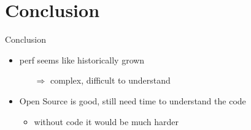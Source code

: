 \section{Conclusion}
\begin{frame}{Conclusion}
\begin{itemize}
  \item perf seems like historically grown
  \begin{itemize}
    \item[$\Rightarrow$] complex, difficult to understand
  \end{itemize}
  \item Open Source is good, still need time to understand the code
  \begin{itemize}
    \item without code it would be much harder
  \end{itemize}
\end{itemize}
\end{frame}




